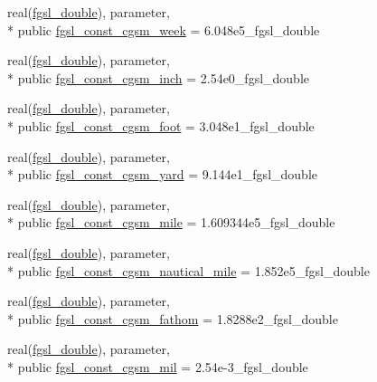 \begin{DoxyCompactItemize}
\item 
real(\hyperlink{classfgsl_a9af5113378e0f000eb479d3f90196ddf}{fgsl\-\_\-double}), parameter, \\*
public \hyperlink{classfgsl_ab1a6fad27f87e45e6de1d5b58d7b86fc}{fgsl\-\_\-const\-\_\-cgsm\-\_\-week} = 6.\-048e5\-\_\-fgsl\-\_\-double
\item 
real(\hyperlink{classfgsl_a9af5113378e0f000eb479d3f90196ddf}{fgsl\-\_\-double}), parameter, \\*
public \hyperlink{classfgsl_ad425eda5fab2505e2342ed4f46b5f5f0}{fgsl\-\_\-const\-\_\-cgsm\-\_\-inch} = 2.\-54e0\-\_\-fgsl\-\_\-double
\item 
real(\hyperlink{classfgsl_a9af5113378e0f000eb479d3f90196ddf}{fgsl\-\_\-double}), parameter, \\*
public \hyperlink{classfgsl_a479fa8c0e8ae3d17e949a4a365a39c19}{fgsl\-\_\-const\-\_\-cgsm\-\_\-foot} = 3.\-048e1\-\_\-fgsl\-\_\-double
\item 
real(\hyperlink{classfgsl_a9af5113378e0f000eb479d3f90196ddf}{fgsl\-\_\-double}), parameter, \\*
public \hyperlink{classfgsl_a3f40255d359411c5789f360fd7c2961e}{fgsl\-\_\-const\-\_\-cgsm\-\_\-yard} = 9.\-144e1\-\_\-fgsl\-\_\-double
\item 
real(\hyperlink{classfgsl_a9af5113378e0f000eb479d3f90196ddf}{fgsl\-\_\-double}), parameter, \\*
public \hyperlink{classfgsl_a56582420eb5e22fb229cf4eea9cb3fca}{fgsl\-\_\-const\-\_\-cgsm\-\_\-mile} = 1.\-609344e5\-\_\-fgsl\-\_\-double
\item 
real(\hyperlink{classfgsl_a9af5113378e0f000eb479d3f90196ddf}{fgsl\-\_\-double}), parameter, \\*
public \hyperlink{classfgsl_ad2fef81cdb19dcaed2ce527744cb8600}{fgsl\-\_\-const\-\_\-cgsm\-\_\-nautical\-\_\-mile} = 1.\-852e5\-\_\-fgsl\-\_\-double
\item 
real(\hyperlink{classfgsl_a9af5113378e0f000eb479d3f90196ddf}{fgsl\-\_\-double}), parameter, \\*
public \hyperlink{classfgsl_a8351533377c64da8b76317b3172c1c76}{fgsl\-\_\-const\-\_\-cgsm\-\_\-fathom} = 1.\-8288e2\-\_\-fgsl\-\_\-double
\item 
real(\hyperlink{classfgsl_a9af5113378e0f000eb479d3f90196ddf}{fgsl\-\_\-double}), parameter, \\*
public \hyperlink{classfgsl_afa02507efeb6d20012bb31b69efa6291}{fgsl\-\_\-const\-\_\-cgsm\-\_\-mil} = 2.\-54e-\/3\-\_\-fgsl\-\_\-double
\item 

\end{DoxyCompactItemize}
